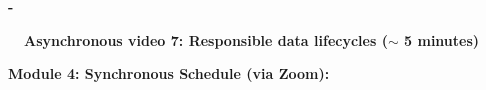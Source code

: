 \documentclass[12pt]{article}
\renewcommand{\_}{\kern-1.5pt\textunderscore\kern-1.5pt}
\begin{document}
\begin{adjustwidth}{0.5in}{0.0in}
\textbf{-}{\fontsize{7pt}{8.4pt}\selectfont \textbf{\ \  \tab Asynchronous video 7: Responsible data lifecycles ($ \sim $ 5 minutes)}\par}\par

\end{adjustwidth}

\textbf{ }\par

\textbf{ }\par

\textbf{Module 4: Synchronous Schedule (via Zoom):}\par



\end{document}
